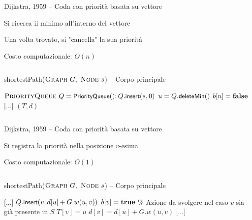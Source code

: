 \begin{frame}{Dijkstra, 1959 -- Coda con priorità basata su vettore}

\vspace{-9pt}
\begin{myboxtitle}
\BI
\item Si ricerca il minimo all'interno del vettore
\item Una volta trovato, si "cancella" la sua priorità
\item Costo computazionale: $O(n)$
\EI
\end{myboxtitle}
    
\vspace{-18pt}
\begin{columns}
\small
\begin{Procedure}
\caption[A]{\textsf{shortestPath}($\textsc{Graph}\ G,\ \textsc{Node}\ s$) -- Corpo principale}
$\textsc{PriorityQueue}\ Q = \textsf{{\small PriorityQueue}}(); Q.\textsf{{\small insert}}(s, 0)$\;
{
  \alert{$u = Q.\textsf{{\small deleteMin}}()$}\;
  $b[u] = \FALSE$\;
  {
    {
      [...]
    }
  }
}
\Return $(T,d)$
\end{Procedure}
\end{columns}

\end{frame}

\begin{frame}{Dijkstra, 1959 -- Coda con priorità basata su vettore}

\vspace{-9pt}
\begin{myboxtitle}
\BI
\item Si registra la priorità nella posizione $v$-esima
\item Costo computazionale: $O(1)$
\EI
\end{myboxtitle}

\vspace{-18pt}
\begin{columns}
\small
\begin{Procedure}
\caption[A]{\textsf{shortestPath}($\textsc{Graph}\ G,\ \textsc{Node}\ s$) -- Corpo principale}
[...]\;
    {
      {
        \alert{$Q.\textsf{{\small insert}}(v, d[u]+G.w(u,v))$}\;
        $b[v] = \TRUE$\;
      }
      {
        \% Azione da svolgere nel caso $v$ sia già presente in $S$
      }
      $T[v] = u$\;
      $d[v] = d[u] + G.w(u,v)$\;
    }
[...]\;
\end{Procedure}
\end{columns}

\end{frame}

